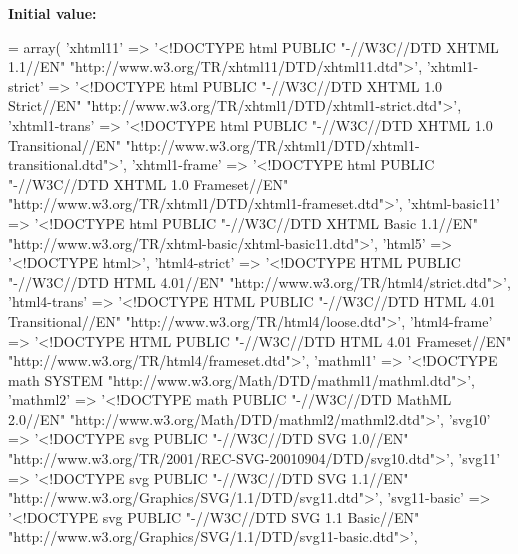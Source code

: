 {\bfseries Initial value\+:}
\begin{DoxyCode}
= array(
    \textcolor{stringliteral}{'xhtml11'} => \textcolor{stringliteral}{'<!DOCTYPE html PUBLIC "-//W3C//DTD XHTML 1.1//EN"
       "http://www.w3.org/TR/xhtml11/DTD/xhtml11.dtd">'},
    \textcolor{stringliteral}{'xhtml1-strict'} => \textcolor{stringliteral}{'<!DOCTYPE html PUBLIC "-//W3C//DTD XHTML 1.0 Strict//EN"
       "http://www.w3.org/TR/xhtml1/DTD/xhtml1-strict.dtd">'},
    \textcolor{stringliteral}{'xhtml1-trans'} => \textcolor{stringliteral}{'<!DOCTYPE html PUBLIC "-//W3C//DTD XHTML 1.0 Transitional//EN"
       "http://www.w3.org/TR/xhtml1/DTD/xhtml1-transitional.dtd">'},
    \textcolor{stringliteral}{'xhtml1-frame'} => \textcolor{stringliteral}{'<!DOCTYPE html PUBLIC "-//W3C//DTD XHTML 1.0 Frameset//EN"
       "http://www.w3.org/TR/xhtml1/DTD/xhtml1-frameset.dtd">'},
    \textcolor{stringliteral}{'xhtml-basic11'} => \textcolor{stringliteral}{'<!DOCTYPE html PUBLIC "-//W3C//DTD XHTML Basic 1.1//EN"
       "http://www.w3.org/TR/xhtml-basic/xhtml-basic11.dtd">'},
    \textcolor{stringliteral}{'html5'} => \textcolor{stringliteral}{'<!DOCTYPE html>'},
    \textcolor{stringliteral}{'html4-strict'} => \textcolor{stringliteral}{'<!DOCTYPE HTML PUBLIC "-//W3C//DTD HTML 4.01//EN"
       "http://www.w3.org/TR/html4/strict.dtd">'},
    \textcolor{stringliteral}{'html4-trans'} => \textcolor{stringliteral}{'<!DOCTYPE HTML PUBLIC "-//W3C//DTD HTML 4.01 Transitional//EN"
       "http://www.w3.org/TR/html4/loose.dtd">'},
    \textcolor{stringliteral}{'html4-frame'} => \textcolor{stringliteral}{'<!DOCTYPE HTML PUBLIC "-//W3C//DTD HTML 4.01 Frameset//EN"
       "http://www.w3.org/TR/html4/frameset.dtd">'},
    \textcolor{stringliteral}{'mathml1'} => \textcolor{stringliteral}{'<!DOCTYPE math SYSTEM "http://www.w3.org/Math/DTD/mathml1/mathml.dtd">'},
    \textcolor{stringliteral}{'mathml2'} => \textcolor{stringliteral}{'<!DOCTYPE math PUBLIC "-//W3C//DTD MathML 2.0//EN"
       "http://www.w3.org/Math/DTD/mathml2/mathml2.dtd">'},
    \textcolor{stringliteral}{'svg10'} => \textcolor{stringliteral}{'<!DOCTYPE svg PUBLIC "-//W3C//DTD SVG 1.0//EN"
       "http://www.w3.org/TR/2001/REC-SVG-20010904/DTD/svg10.dtd">'},
    \textcolor{stringliteral}{'svg11'} => \textcolor{stringliteral}{'<!DOCTYPE svg PUBLIC "-//W3C//DTD SVG 1.1//EN"
       "http://www.w3.org/Graphics/SVG/1.1/DTD/svg11.dtd">'},
    \textcolor{stringliteral}{'svg11-basic'} => \textcolor{stringliteral}{'<!DOCTYPE svg PUBLIC "-//W3C//DTD SVG 1.1 Basic//EN"
       "http://www.w3.org/Graphics/SVG/1.1/DTD/svg11-basic.dtd">'},

\end{DoxyCode}
